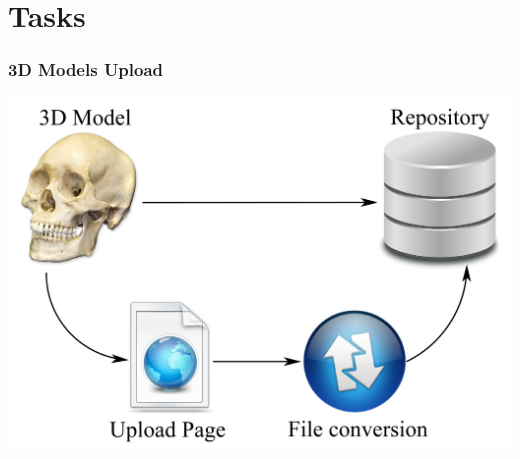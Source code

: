 \section{Tasks}

\begin{frame}
  \frametitle{3D Models Upload}
  \includegraphics[width=\textwidth]{images/UploadPage}
\end{frame}

